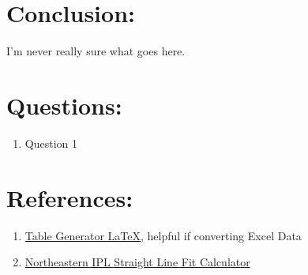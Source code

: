\documentclass[12pt,a4paper]{article}
\begin{document}
\section*{Conclusion:}
	I'm never really sure what goes here.

\section*{Questions:}
	\begin{enumerate}
		\item Question 1
	\end{enumerate}
	
\section*{References:}
	\begin{enumerate}
		\item \href{https://www.tablesgenerator.com/#}{Table Generator \LaTeX}, helpful if converting Excel Data
		\item \href{https://web.northeastern.edu/ipl/data-analysis/straight-line-fit/}{Northeastern IPL Straight Line Fit Calculator}
	\end{enumerate}
\end{document}

